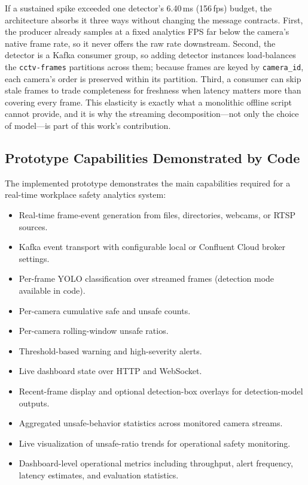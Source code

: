 \documentclass[conference]{IEEEtran}
\begin{document}
If a sustained spike exceeded one detector's 6.40\,ms (156\,fps) budget, the
architecture absorbs it three ways without changing the message contracts. First,
the producer already samples at a fixed analytics FPS far below the camera's
native frame rate, so it never offers the raw rate downstream. Second, the
detector is a Kafka consumer group, so adding detector instances load-balances the
\texttt{cctv-frames} partitions across them; because frames are keyed by
\texttt{camera\_id}, each camera's order is preserved within its partition. Third,
a consumer can skip stale frames to trade completeness for freshness when latency
matters more than covering every frame. This elasticity is exactly what a
monolithic offline script cannot provide, and it is why the streaming
decomposition---not only the choice of model---is part of this work's
contribution.

\subsection{Prototype Capabilities Demonstrated by Code}

The implemented prototype demonstrates the main capabilities required for
a real-time workplace safety analytics system:

\begin{itemize}
    \item Real-time frame-event generation from files, directories,
    webcams, or RTSP sources.

    \item Kafka event transport with configurable local or Confluent Cloud
    broker settings.

    \item Per-frame YOLO classification over streamed frames (detection mode available in code).

    \item Per-camera cumulative safe and unsafe counts.

    \item Per-camera rolling-window unsafe ratios.

    \item Threshold-based warning and high-severity alerts.

    \item Live dashboard state over HTTP and WebSocket.

    \item Recent-frame display and optional detection-box overlays for
    detection-model outputs.

    \item Aggregated unsafe-behavior statistics across monitored camera
    streams.

    \item Live visualization of unsafe-ratio trends for operational safety
    monitoring.

    \item Dashboard-level operational metrics including throughput,
    alert frequency, latency estimates, and evaluation statistics.
\end{itemize}
\end{document}
